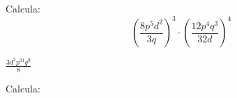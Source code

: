 \documentclass[addpoints,spanish, 12pt,a4paper]{exam}
\begin{document}
\begin{questions}

\question[2] Calcula: $$\left(\dfrac{8p^5d^2}{3q}\right)^3\cdot\left(\dfrac{12p^4q^3}{32d}\right)^4$$
\begin{solution}$\frac{3 d^{2} p^{31} q^{9}}{8}$  \end{solution}

\addpoints

\question Calcula: 

\addpoints


\end{questions}
\end{document}
